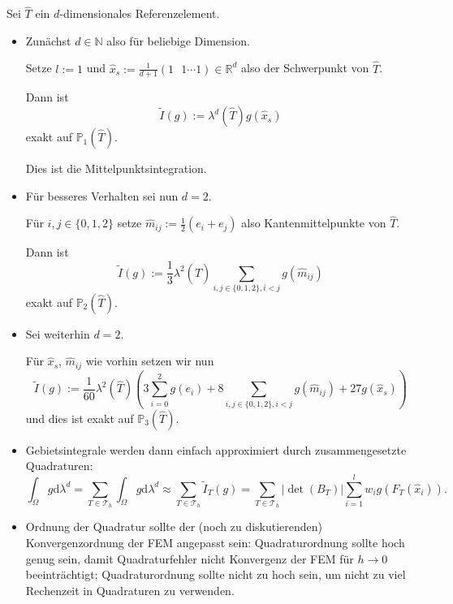 \documentclass{book}
\newcommand{\assign}{:=}
\newcommand{\mathd}{\mathrm{d}}
\newcommand{\tmtextbf}[1]{\text{{\bfseries{#1}}}}
\newenvironment{itemizedot}{\begin{itemize} \renewcommand{\labelitemi}{$\bullet$}\renewcommand{\labelitemii}{$\bullet$}\renewcommand{\labelitemiii}{$\bullet$}\renewcommand{\labelitemiv}{$\bullet$}}{\end{itemize}}
\begin{document}
\begin{example*}
  Sei $\hat{T}$ ein $d$-dimensionales Referenzelement.
  \begin{itemizedot}
    \item Zun{\"a}chst $d \in \mathbb{N}$ also f{\"u}r beliebige Dimension.
    
    Setze $l \assign 1$ und $\hat{x}_s \assign \frac{1}{d + 1} \left( 1
    \text{ } 1 \cdots 1 \right) \in \mathbb{R}^d$ also der Schwerpunkt von
    $\hat{T}$.
    
    Dann ist
    \[ \tilde{I} (g) \assign \lambda^d (\hat{T}) g (\hat{x}_s) \]
    exakt auf $\mathbb{P}_1 (\hat{T})$.
    
    Dies ist die Mittelpunktsintegration.
    
    \item F{\"u}r besseres Verhalten sei nun $d = 2$.
    
    F{\"u}r $i, j \in \{ 0, 1, 2 \}$ setze $\hat{m}_{i j} \assign \frac{1}{2}
    (e_i + e_j)$ also Kantenmittelpunkte von $\hat{T}$.
    
    Dann ist
    \[ \tilde{I} (g) \assign \frac{1}{3} \lambda^2 (\hat{T})   \sum_{i, j \in
       \{ 0, 1, 2 \}, i < j} g (\hat{m}_{i j}) \]
    exakt auf $\mathbb{P}_2 (\hat{T})$.
    
    \item Sei weiterhin $d = 2$.
    
    F{\"u}r $\hat{x}_s$, $\hat{m}_{i j}$ wie vorhin setzen wir nun
    \[ \tilde{I} (g) \assign \frac{1}{60} \lambda^2 (\hat{T}) \left( 3
       \sum_{i = 0}^2 g (e_i) + 8 \sum_{i, j \in \{ 0, 1, 2 \}, i < j} g
       (\hat{m}_{i j}) + 27 g (\hat{x}_s) \right) \]
    und dies ist exakt auf $\mathbb{P}_3 (\hat{T})$.
  \end{itemizedot}
\end{example*}

\begin{remark*}
  \tmtextbf{(Quadraturen)}
  \begin{itemizedot}
    \item Gebietsintegrale werden dann einfach approximiert durch
    zusammengesetzte Quadraturen:
    \[ \int_{\Omega} g \mathd \lambda^d = \sum_{T \in \mathcal{T}_h}
       \int_{\Omega} g \mathd \lambda^d \approx \sum_{T \in \mathcal{T}_h}
       \tilde{I}_T (g) = \sum_{T \in \mathcal{T}_h} | \det (B_T) | \sum_{i =
       1}^l w_i g (F_T (\hat{x}_i)) . \]
    \item Ordnung der Quadratur sollte der (noch zu diskutierenden)
    Konvergenzordnung der FEM angepasst sein: Quadraturordnung sollte hoch
    genug sein, damit Quadraturfehler nicht Konvergenz der FEM f{\"u}r $h
    \rightarrow 0$ beeintr{\"a}chtigt; Quadraturordnung sollte nicht zu hoch
    sein, um nicht zu viel Rechenzeit in Quadraturen zu verwenden. 
  \end{itemizedot}
\end{remark*}
\end{document}
